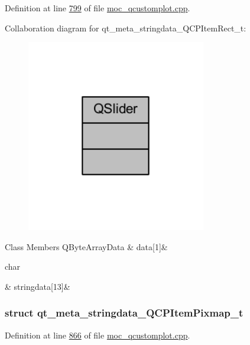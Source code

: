Definition at line \hyperlink{a00067_source_l00799}{799} of file \hyperlink{a00067_source}{moc\+\_\+qcustomplot.\+cpp}.



Collaboration diagram for qt\+\_\+meta\+\_\+stringdata\+\_\+\+Q\+C\+P\+Item\+Rect\+\_\+t\+:
\nopagebreak
\begin{figure}[H]
\begin{center}
\leavevmode
\includegraphics[width=222pt]{df/d95/a00299}
\end{center}
\end{figure}
\begin{DoxyFields}{Class Members}
\hypertarget{a00067_abb87c72758ddd18aa3c36a7ee960fa1f}{Q\+Byte\+Array\+Data}\label{a00067_abb87c72758ddd18aa3c36a7ee960fa1f}
&
data\mbox{[}1\mbox{]}&
\\
\hline

\hypertarget{a00067_a8006d9df79f24f9dc9846ce4485c145a}{char}\label{a00067_a8006d9df79f24f9dc9846ce4485c145a}
&
stringdata\mbox{[}13\mbox{]}&
\\
\hline

\end{DoxyFields}
\label{db/d53/a00202}
\hypertarget{a00067_db/d53/a00202}{}
\subsubsection{struct qt\+\_\+meta\+\_\+stringdata\+\_\+\+Q\+C\+P\+Item\+Pixmap\+\_\+t}


Definition at line \hyperlink{a00067_source_l00866}{866} of file \hyperlink{a00067_source}{moc\+\_\+qcustomplot.\+cpp}.




